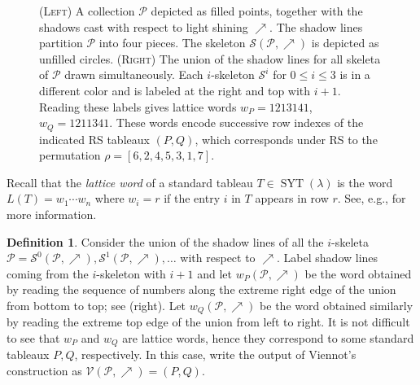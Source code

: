 \documentclass{amsart}
\theoremstyle{definition}
\newtheorem{definition}[theorem]{Definition}
\DeclareMathOperator{\SYT}{SYT}
\begin{document}
\begin{figure}[hbtp]
{%
    }
    \caption{(\textsc{Left}) A collection $\mathcal{P}$ depicted as filled points, together with the shadows cast with respect to light shining $\nearrow$. The shadow lines partition $\mathcal{P}$ into four pieces. The skeleton $\mathcal{S}(\mathcal{P}, \nearrow)$ is depicted as unfilled circles. (\textsc{Right}) The union of the shadow lines for all skeleta of $\mathcal{P}$ drawn simultaneously. Each $i$-skeleton $\mathcal{S}^i$ for $0 \leq i \leq 3$ is in a different color and is labeled at the right and top with $i+1$. Reading these labels gives lattice words $w_P = 1213141$, $w_Q = 1211341$. These words encode successive row indexes of the indicated RS tableaux $(P, Q)$, which corresponds under RS to the permutation $\rho = [6, 2, 4, 5, 3, 1, 7]$.}
    \label{fig:Viennot-construction}
\end{figure}


Recall that the \emph{lattice word} of a standard tableau $T \in \SYT(\lambda)$ is the word $L(T) = w_1 \cdots w_n$ where $w_i=r$ if the entry $i$ in $T$ appears in row $r$. See, e.g., \cite[\S2.4, \S8]{fluctuating-paper} for more information.

\begin{definition}
    Consider the union of the shadow lines of all the $i$-skeleta $\mathcal{P} = \mathcal{S}^0(\mathcal{P}, \nearrow), \mathcal{S}^1(\mathcal{P}, \nearrow), \ldots$ with respect to $\nearrow$. Label shadow lines coming from the $i$-skeleton with $i+1$ and let $w_P(\mathcal{P}, \nearrow)$ be the word obtained by reading the sequence of numbers along the extreme right edge of the union from bottom to top; see  (right). Let $w_Q(\mathcal{P}, \nearrow)$ be the word obtained similarly by reading the extreme top edge of the union from left to right. It is not difficult to see that $w_P$ and $w_Q$ are lattice words, hence they correspond to some standard tableaux $P, Q$, respectively. In this case, write the output of Viennot's construction as $\mathcal{V}(\mathcal{P}, \nearrow) = (P, Q)$.
\end{definition}
\end{document}
